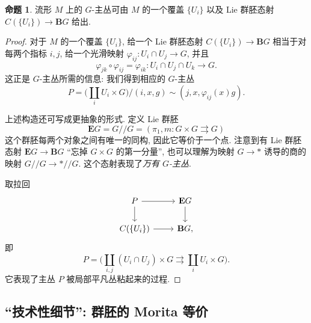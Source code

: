 \documentclass{article}
\theoremstyle{definition}
\newtheorem{definition}{定义}[section]
\newtheorem{prop}[definition]{命题}
\newcommand{\GroupoidQuotient}{/\!\!/}
\begin{document}
	\begin{prop}
		流形 $M$ 上的 $G$-主丛可由 $M$ 的一个覆盖 $\{U_i\}$ 以及 Lie 群胚态射 $C(\{U_i\}) \to \mathbf BG$ 给出.
	\end{prop}
	\begin{proof}
		对于 $M$ 的一个覆盖 $\{U_i\}$, 给一个 Lie 群胚态射 $C(\{U_i\}) \to \mathbf BG$ 相当于对每两个指标 $i,j$, 给一个光滑映射
		$\varphi_{ij}\colon U_i\cap U_j \to G$, 并且
		$$
		\varphi_{jk}\circ\varphi_{ij} = \varphi_{ik}\colon U_i\cap U_j\cap U_k\to G.
		$$
		这正是 $G$-主丛所需的信息: 我们得到相应的 $G$-主丛
		$$
		P= \Big(\coprod_i U_i\times G\Big)\Big/(i,x,g)\sim (j,x,\varphi_{ij}(x)g).
		$$
		
		上述构造还可写成更抽象的形式. 定义 Lie 群胚
		$$
		\mathbf EG = G \GroupoidQuotient G = (\pi_1,m\colon G\times G \rightrightarrows G)
		$$
		这个群胚每两个对象之间有唯一的同构, 因此它等价于一个点.
		注意到有 Lie 群胚态射 $\mathbf EG\to\mathbf BG$ ``忘掉 $G\times G$ 的第一分量'', 也可以理解为映射 $G\to *$ 诱导的商的映射 $G\GroupoidQuotient G \to * \GroupoidQuotient G$.
		这个态射表现了\emph{万有 $G$-主丛}.
		
		取拉回
		\[\begin{tikzcd}[ampersand replacement=\&]
			P \& {\mathbf EG} \\
			{C(\{U_i\})} \& {\mathbf BG,}
			\arrow[from=1-1, to=1-2]
			\arrow[from=1-1, to=2-1]
			\arrow[from=1-2, to=2-2]
			\arrow[from=2-1, to=2-2]
		\end{tikzcd}\]
		即
		$$
		P=\Big(\coprod_{i,j} (U_i\cap U_j)\times G \rightrightarrows \coprod_i U_i\times G\Big).
		$$
		它表现了主丛 $P$ 被局部平凡丛粘起来的过程.
	\end{proof}
	
	
	
%	
	
	\subsection{``技术性细节'': 群胚的 Morita 等价}
	
\end{document}
